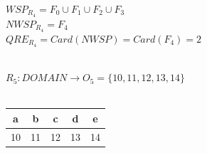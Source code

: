 		\noindent
		$WSP_{R_{4}} = F_{0} \cup F_{1} \cup  F_{2} \cup F_{3}$\\
		$NWSP_{R_{4}} = F_{4}$\\
		$QRE_{R_{4}} = Card(NWSP) = Card(F_{4})= 2 $
		\\\\
		
		\newpage
		
		\noindent
		$R_{5}: DOMAIN \rightarrow O_{5}=\{10,11,12,13,14\}$\\\\
		\begin{table}[h!]
			\begin{center}
				\begin{tabular}{|c|c|c|c|c|}
					\hline
					a & b & c & d & e \\
					\hline
					10 & 11 & 12 & 13 & 14 \\
					\hline
				\end{tabular}
			\end{center}
		\end{table}
		
